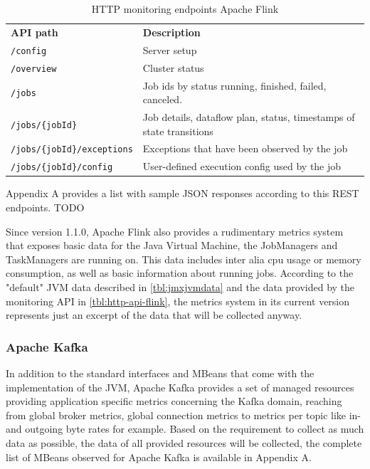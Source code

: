 \begin{table}[H]
    \begin{tabular}{ll}
        \textbf{API path} & \textbf{Description} \\
        \verb|/config| & Server setup \\
        \verb|/overview| & Cluster status \\
        \verb|/jobs| & Job ids by status running, finished, failed, canceled. \\
        \verb|/jobs/{jobId}| & Job details, dataflow plan, status, timestamps of state transitions \\
        \verb|/jobs/{jobId}/exceptions| &  Exceptions that have been observed by the job \\
        \verb|/jobs/{jobId}/config| & User-defined execution config used by the job \\
    \end{tabular}
    \caption{HTTP monitoring endpoints Apache Flink}
    \label{tbl:http-api-flink}
\end{table}

Appendix A provides a list with sample JSON responses according to this REST endpoints. TODO

Since version 1.1.0, Apache Flink also provides a rudimentary metrics system that exposes
basic data for the Java Virtual Machine, the JobManagers and TaskManagers are running
on. This data includes inter alia cpu usage or memory consumption, as well as basic
information about running jobs. According to the "default" JVM data described in \autoref{tbl:jmxjvmdata}
and the data provided by the monitoring API in \autoref{tbl:http-api-flink}, the metrics system in its current version
represents just an excerpt of the data that will be collected anyway.

\subsubsection{Apache Kafka}

In addition to the standard interfaces and MBeans that come with the implementation
of the JVM, Apache Kafka provides a set of managed resources providing application
specific metrics concerning the Kafka domain, reaching from global broker metrics, global
connection metrics to metrics per topic like in- and outgoing byte rates for example. Based
on the requirement to collect as much data as possible, the data of all provided resources
will be collected, the complete list of MBeans observed for Apache Kafka is available in
Appendix A.

